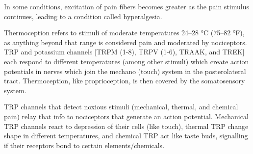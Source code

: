 In some conditions, excitation of pain fibers becomes greater as the pain stimulus continues, leading to a condition called hyperalgesia.

Thermoception refers to stimuli of moderate temperatures 24--28 °C (75--82 °F), as anything beyond that range is considered pain and moderated by nociceptors. TRP and potassium channels {[}TRPM (1-8), TRPV (1-6), TRAAK, and TREK{]} each respond to different temperatures (among other stimuli) which create action potentials in nerves which join the mechano (touch) system in the posterolateral tract. Thermoception, like proprioception, is then covered by the somatosensory system.

TRP channels that detect noxious stimuli (mechanical, thermal, and chemical pain) relay that info to nociceptors that generate an action potential. Mechanical TRP channels react to depression of their cells (like touch), thermal TRP change shape in different temperatures, and chemical TRP act like taste buds, signalling if their receptors bond to certain elements/chemicals.




